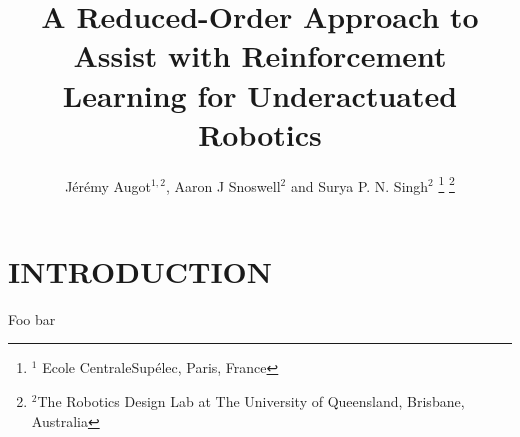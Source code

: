 \documentclass[letterpaper, 10 pt, conference]{ieeeconf}
\title{
    \LARGE \bf%
    A Reduced-Order Approach to Assist with Reinforcement Learning for Underactuated Robotics
}
\author{
    J\'er\'emy Augot$^{1,2}$, Aaron J Snoswell$^{2}$ and Surya P. N. Singh$^{2}$
    \thanks{
        $^{1}$ Ecole CentraleSup\'elec, Paris, France
    }%
    \thanks{
        $^{2}$The Robotics Design Lab at The University of Queensland, Brisbane, Australia
    }%
}
\begin{document}
\maketitle
\thispagestyle{empty}
\pagestyle{empty}

\begin{abstract}

\lipsum[1]

\end{abstract}

\section{INTRODUCTION}

Foo bar \cite{Haarnoja2018SAC}

\lipsum[1-2]
\end{document}
